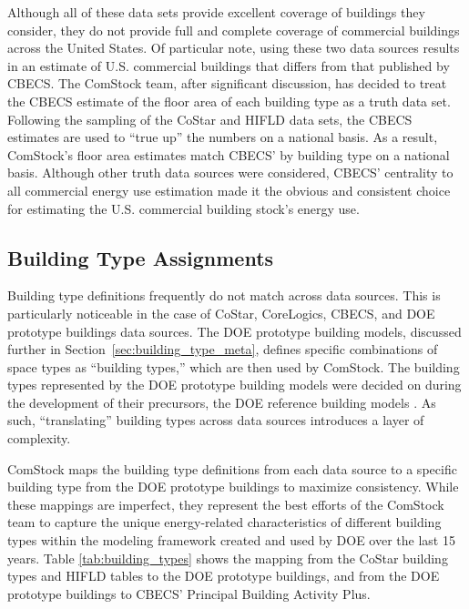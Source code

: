 Although all of these data sets provide excellent coverage of buildings they consider, they do not provide full and complete coverage of commercial buildings across the United States. Of particular note, using these two data sources results in an estimate of U.S. commercial buildings that differs from that published by CBECS. The ComStock team, after significant discussion, has decided to treat the CBECS estimate of the floor area of each building type as a truth data set. Following the sampling of the CoStar and HIFLD data sets, the CBECS estimates are used to ``true up'' the numbers on a national basis. As a result, ComStock's floor area estimates match CBECS' by building type on a national basis. Although other truth data sources were considered, CBECS' centrality to all commercial energy use estimation made it the obvious and consistent choice for estimating the U.S. commercial building stock's energy use.

\subsection{Building Type Assignments}

Building type definitions frequently do not match across data sources. This is particularly noticeable in the case of CoStar, CoreLogics, CBECS, and DOE prototype buildings data sources. The DOE prototype building models, discussed further in Section~\ref{sec:building_type_meta}, defines specific combinations of space types as ``building types,'' which are then used by ComStock. The building types represented by the DOE prototype building models were decided on during the development of their precursors, the DOE reference building models \citep{doe_reference_buildings}. As such, ``translating'' building types across data sources introduces a layer of complexity. 

ComStock maps the building type definitions from each data source to a specific building type from the DOE prototype buildings to maximize consistency. While these mappings are imperfect, they represent the best efforts of the ComStock team to capture the unique energy-related characteristics of different building types within the modeling framework created and used by DOE over the last 15 years. Table \ref{tab:building_types} shows the mapping from the CoStar building types and HIFLD tables to the DOE prototype buildings, and from the DOE prototype buildings to CBECS' Principal Building Activity Plus.



